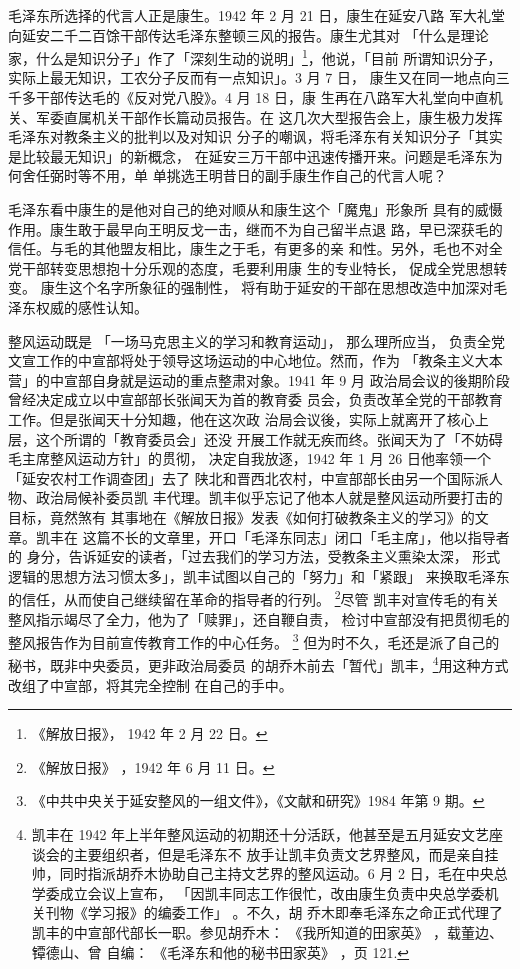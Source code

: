 毛泽东所选择的代言人正是康生。1942 年 2 月 21 日，康生在延安八路
军大礼堂向延安二千二百馀干部传达毛泽东整顿三风的报告。康生尤其对
 「什么是理论家，什么是知识分子」作了「深刻生动的说明」\footnote{《解放日报》，
1942 年 2 月 22 日。
}，他说，「目前
所谓知识分子，实际上最无知识，工农分子反而有一点知识」。3 月 7 日，
康生又在同一地点向三千多干部传达毛的《反对党八股》。4 月 18 日，康
生再在八路军大礼堂向中直机关、军委直属机关干部作长篇动员报告。在
这几次大型报告会上，康生极力发挥毛泽东对教条主义的批判以及对知识
分子的嘲讽，将毛泽东有关知识分子「其实是比较最无知识」的新概念，
在延安三万干部中迅速传播开来。问题是毛泽东为何舍任弼时等不用，单
单挑选王明昔日的副手康生作自己的代言人呢？

毛泽东看中康生的是他对自己的绝对顺从和康生这个「魔鬼」形象所
具有的威慑作用。康生敢于最早向王明反戈一击，继而不为自己留半点退
路，早已深获毛的信任。与毛的其他盟友相比，康生之于毛，有更多的亲
和性。另外，毛也不对全党干部转变思想抱十分乐观的态度，毛要利用康
生的专业特长，
促成全党思想转变。
康生这个名字所象征的强制性，
将有助于延安的干部在思想改造中加深对毛泽东权威的感性认知。

整风运动既是
「一场马克思主义的学习和教育运动」， 那么理所应当，
负责全党文宣工作的中宣部将处于领导这场运动的中心地位。然而，作为
「教条主义大本营」的中宣部自身就是运动的重点整肃对象。1941 年 9 月
政治局会议的後期阶段曾经决定成立以中宣部部长张闻天为首的教育委
员会，负责改革全党的干部教育工作。但是张闻天十分知趣，他在这次政
治局会议後，实际上就离开了核心上层，这个所谓的「教育委员会」还没
开展工作就无疾而终。张闻天为了「不妨碍毛主席整风运动方针」的贯彻，
决定自我放逐，1942 年 1 月 26 日他率领一个「延安农村工作调查团」去了
陕北和晋西北农村，中宣部部长由另一个国际派人物、政治局候补委员凯
丰代理。凯丰似乎忘记了他本人就是整风运动所要打击的目标，竟然煞有
其事地在《解放日报》发表《如何打破教条主义的学习》的文章。凯丰在
这篇不长的文章里，开口「毛泽东同志」闭口「毛主席」，他以指导者的
身分，告诉延安的读者，「过去我们的学习方法，受教条主义熏染太深，
形式逻辑的思想方法习惯太多」，凯丰试图以自己的「努力」和「紧跟」
来换取毛泽东的信任，从而使自己继续留在革命的指导者的行列。
\footnote{《解放日报》
，1942 年 6 月 11 日。
}尽管
凯丰对宣传毛的有关整风指示竭尽了全力，他为了「赎罪」，还自鞭自责，
检讨中宣部没有把贯彻毛的整风报告作为目前宣传教育工作的中心任务。
\footnote{《中共中央关于延安整风的一组文件》，《文献和研究》1984 年第 9 期。
}
但为时不久，毛还是派了自己的秘书，既非中央委员，更非政治局委员
的胡乔木前去「暂代」凯丰，\footnote{凯丰在 1942 年上半年整风运动的初期还十分活跃，他甚至是五月延安文艺座谈会的主要组织者，但是毛泽东不
放手让凯丰负责文艺界整风，而是亲自挂帅，同时指派胡乔木协助自己主持文艺界的整风运动。6 月 2 日，毛在中央总
学委成立会议上宣布，
「因凯丰同志工作很忙，改由康生负责中央总学委机关刊物《学习报》的编委工作」
。不久，胡
乔木即奉毛泽东之命正式代理了凯丰的中宣部代部长一职。参见胡乔木：
《我所知道的田家英》
，载董边、镡德山、曾
自编：
《毛泽东和他的秘书田家英》
，页 121.}用这种方式改组了中宣部，将其完全控制
在自己的手中。

